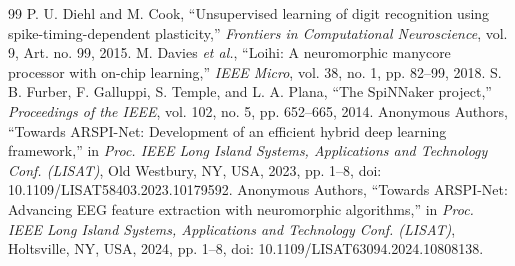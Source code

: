 \documentclass[journal]{IEEEtran}
\begin{document}
\begin{thebibliography}{99}
 P. U. Diehl and M. Cook, ``Unsupervised learning of digit recognition using spike-timing-dependent plasticity,'' \emph{Frontiers in Computational Neuroscience}, vol. 9, Art. no. 99, 2015.
 M. Davies \emph{et al.}, ``Loihi: A neuromorphic manycore processor with on-chip learning,'' \emph{IEEE Micro}, vol. 38, no. 1, pp. 82--99, 2018.
 S. B. Furber, F. Galluppi, S. Temple, and L. A. Plana, ``The SpiNNaker project,'' \emph{Proceedings of the IEEE}, vol. 102, no. 5, pp. 652--665, 2014.
 Anonymous Authors, ``Towards ARSPI-Net: Development of an efficient hybrid deep learning framework,'' in \emph{Proc. IEEE Long Island Systems, Applications and Technology Conf. (LISAT)}, Old Westbury, NY, USA, 2023, pp. 1--8, doi: 10.1109/LISAT58403.2023.10179592.
 Anonymous Authors, ``Towards ARSPI-Net: Advancing EEG feature extraction with neuromorphic algorithms,'' in \emph{Proc. IEEE Long Island Systems, Applications and Technology Conf. (LISAT)}, Holtsville, NY, USA, 2024, pp. 1--8, doi: 10.1109/LISAT63094.2024.10808138.
\end{thebibliography}
\end{document}
